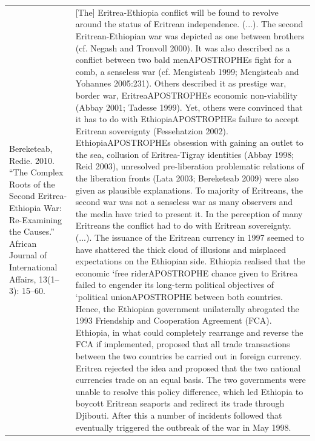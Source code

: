 {\begin{longtable}{p{}p{}}
\\
Bereketeab, Redie. 2010. “The Complex Roots of the Second Eritrea-Ethiopia War: Re-Examining the Causes.” African Journal of International Affairs, 13(1–3): 15–60. & [The] Eritrea-Ethiopia conflict will be found to revolve around the status of Eritrean independence. (...). The second Eritrean-Ethiopian war was depicted as one between brothers (cf. Negash and Tronvoll 2000). It was also described as a conflict between two bald menAPOSTROPHEs fight for a comb, a senseless war (cf. Mengisteab 1999; Mengisteab and Yohannes 2005:231). Others described it as prestige war, border war, EritreaAPOSTROPHEs economic non-viability (Abbay 2001; Tadesse 1999). Yet, others were convinced that it has to do with EthiopiaAPOSTROPHEs failure to accept Eritrean sovereignty (Fessehatzion 2002). EthiopiaAPOSTROPHEs obsession with gaining an outlet to the sea, collusion of Eritrea-Tigray identities (Abbay 1998; Reid 2003), unresolved pre-liberation problematic relations of the liberation fronts (Lata 2003; Bereketeab 2009) were also given as plausible explanations. To majority of Eritreans, the second war was not a senseless war as many observers and the media have tried to present it. In the perception of many Eritreans the conflict had to do with Eritrean sovereignty. (...).
The issuance of the Eritrean currency in 1997 seemed to have shattered the thick cloud of illusions and misplaced expectations on the Ethiopian side. Ethiopia realised that the economic ‘free riderAPOSTROPHE chance given to Eritrea failed to engender its long-term political objectives of ‘political unionAPOSTROPHE between both countries. Hence, the Ethiopian government unilaterally abrogated the 1993 Friendship and Cooperation Agreement (FCA). Ethiopia, in what could completely rearrange and reverse the FCA if implemented, proposed that all trade transactions between the two countries be carried out in foreign currency. Eritrea rejected the idea and proposed that the two national currencies trade on an equal basis. The two governments were unable to resolve this policy difference, which led Ethiopia to boycott Eritrean seaports and redirect its trade through Djibouti. After this a number of incidents followed that eventually triggered the outbreak of the war in May 1998.
\\

\end{longtable}}

